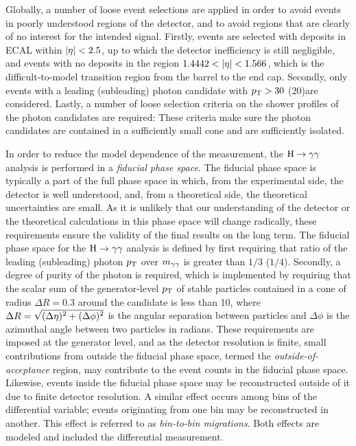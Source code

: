 Globally, a number of loose event selections are applied in order to avoid events in poorly understood regions of the detector, and to avoid regions that are clearly of no interest for the intended signal.
% 
Firstly, events are selected with deposits in ECAL within $\left| \eta \right |<2.5$, up to which the detector inefficiency is still negligible, and events with no deposits in the region $1.4442 < \left| \eta \right | < 1.566$, which is the difficult-to-model transition region from the barrel to the end cap.
% 
Secondly, only events with a leading (subleading) photon candidate with $p_\mathrm{T} > 30$ (20)\GeV are considered.
% 
Lastly, a number of loose selection criteria on the shower profiles of the photon candidates are required: These criteria make sure the photon candidates are contained in a sufficiently small cone and are sufficiently isolated.


In order to reduce the model dependence of the measurement, the $\mathrm{H}\to\mathrm{\gamma}\mathrm{\gamma}$ analysis is performed in a \textit{fiducial phase space}.
% 
The fiducial phase space is typically a part of the full phase space in which, from the experimental side, the detector is well understood, and, from a theoretical side, the theoretical uncertainties are small.
% 
As it is unlikely that our understanding of the detector or the theoretical calculations in this phase space will change radically, these requirements ensure the validity of the final results on the long term.
% 
The fiducial phase space for the $\mathrm{H}\to\mathrm{\gamma}\mathrm{\gamma}$ analysis is defined by first requiring that ratio of the leading (subleading) photon $p_\mathrm{T}$ over $m_{\mathrm{\gamma}\mathrm{\gamma}}$ is greater than $1/3$ ($1/4$).
% 
Secondly, a degree of purity of the photon is required, which is implemented by requiring that the scalar sum of the generator-level $p_\mathrm{T}$ of stable particles contained in a cone of radius $\Delta R=0.3$ around the candidate is less than 10\GeV, where $\Delta R = \sqrt{\smash[b]{(\Delta\eta)^2+(\Delta\phi)^2}}$ is the angular separation between particles and $\Delta\phi$ is the azimuthal angle between two particles in radians.
% 
These requirements are imposed at the generator level, and as the detector resolution is finite, small contributions from outside the fiducial phase space, termed the \textit{outside-of-acceptance} region, may contribute to the event counts in the fiducial phase space.
% 
Likewise, events inside the fiducial phase space may be reconstructed outside of it due to finite detector resolution.
% 
A similar effect occurs among bins of the differential variable; events originating from one bin may be reconstructed in another.
% 
This effect is referred to as \textit{bin-to-bin migrations}.
% 
Both effects are modeled and included the differential measurement.


